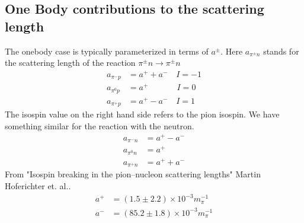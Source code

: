 \documentclass[11pt]{article}
\begin{document}
\subsection{One Body contributions to the scattering length}
The onebody case is typically parameterized in terms of $a^\pm$. Here $a_{\pi^\pm n}$ stands for the scattering length of the reaction $\pi^\pm n \to \pi^\pm n$
\begin{align}
    a_{\pi^-p}&=a^+ +a^-\quad I=-1\\
    a_{\pi^0p}&=a^+\,\qquad\quad\; I=0\\
    a_{\pi^+p}&=a^+ -a^- \quad I=1
\end{align}
The isospin value on the right hand side refers to the pion isospin. We have something similar for the reaction with the neutron.
\begin{align}
    a_{\pi^-n}&=a^+ -a^-\\
    a_{\pi^0n}&=a^+\\
    a_{\pi^+n}&=a^+ +a^- 
\end{align}
From "Isospin breaking in the pion–nucleon scattering lengths" Martin Hoferichter et. al..
\begin{align}
    a^+&=(1.5 \pm 2.2)\times 10^{-3} m_\pi^{-1}\\
    a^-&=(85.2 \pm 1.8)\times 10^{-3} m_\pi^{-1}
\end{align}
\end{document}
